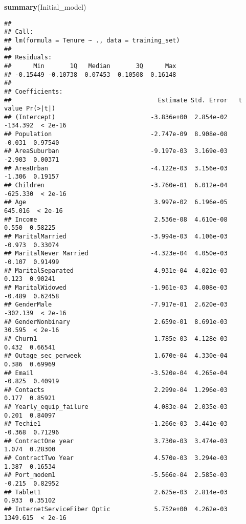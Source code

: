 \documentclass[
]{article}
\newenvironment{Shaded}{\begin{snugshade}}{\end{snugshade}}
\newcommand{\FunctionTok}[1]{\textcolor[rgb]{0.13,0.29,0.53}{\textbf{#1}}}
\newcommand{\NormalTok}[1]{#1}
\begin{document}
\begin{Shaded}
\begin{Highlighting}[]
\FunctionTok{summary}\NormalTok{(Initial\_model)}
\end{Highlighting}
\end{Shaded}

\begin{verbatim}
## 
## Call:
## lm(formula = Tenure ~ ., data = training_set)
## 
## Residuals:
##      Min       1Q   Median       3Q      Max 
## -0.15449 -0.10738  0.07453  0.10508  0.16148 
## 
## Coefficients:
##                                        Estimate Std. Error   t value Pr(>|t|)
## (Intercept)                          -3.836e+00  2.854e-02  -134.392  < 2e-16
## Population                           -2.747e-09  8.908e-08    -0.031  0.97540
## AreaSuburban                         -9.197e-03  3.169e-03    -2.903  0.00371
## AreaUrban                            -4.122e-03  3.156e-03    -1.306  0.19157
## Children                             -3.760e-01  6.012e-04  -625.330  < 2e-16
## Age                                   3.997e-02  6.196e-05   645.016  < 2e-16
## Income                                2.536e-08  4.610e-08     0.550  0.58225
## MaritalMarried                       -3.994e-03  4.106e-03    -0.973  0.33074
## MaritalNever Married                 -4.323e-04  4.050e-03    -0.107  0.91499
## MaritalSeparated                      4.931e-04  4.021e-03     0.123  0.90241
## MaritalWidowed                       -1.961e-03  4.008e-03    -0.489  0.62458
## GenderMale                           -7.917e-01  2.620e-03  -302.139  < 2e-16
## GenderNonbinary                       2.659e-01  8.691e-03    30.595  < 2e-16
## Churn1                                1.785e-03  4.128e-03     0.432  0.66541
## Outage_sec_perweek                    1.670e-04  4.330e-04     0.386  0.69969
## Email                                -3.520e-04  4.265e-04    -0.825  0.40919
## Contacts                              2.299e-04  1.296e-03     0.177  0.85921
## Yearly_equip_failure                  4.083e-04  2.035e-03     0.201  0.84097
## Techie1                              -1.266e-03  3.441e-03    -0.368  0.71296
## ContractOne year                      3.730e-03  3.474e-03     1.074  0.28300
## ContractTwo Year                      4.570e-03  3.294e-03     1.387  0.16534
## Port_modem1                          -5.566e-04  2.585e-03    -0.215  0.82952
## Tablet1                               2.625e-03  2.814e-03     0.933  0.35102
## InternetServiceFiber Optic            5.752e+00  4.262e-03  1349.615  < 2e-16

\end{verbatim}
\end{document}
